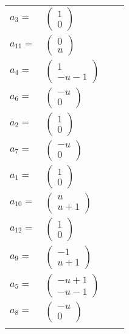 \documentclass[1p]{elsarticle_modified}
\theoremstyle{definition}
\begin{document}
\begin{tabular}{m{7pt} m{180pt} m{7pt} m{180pt} }
\flushright $a_{3}=$&$\begin{pmatrix}1\\0\end{pmatrix}$ \\
\flushright $a_{11}=$&$\begin{pmatrix}0\\u\end{pmatrix}$ \\
\flushright $a_{4}=$&$\begin{pmatrix}1\\- u-1\end{pmatrix}$ \\
\flushright $a_{6}=$&$\begin{pmatrix}- u\\0\end{pmatrix}$ \\
\flushright $a_{2}=$&$\begin{pmatrix}1\\0\end{pmatrix}$ \\
\flushright $a_{7}=$&$\begin{pmatrix}- u\\0\end{pmatrix}$ \\
\flushright $a_{1}=$&$\begin{pmatrix}1\\0\end{pmatrix}$ \\
\flushright $a_{10}=$&$\begin{pmatrix}u\\u+1\end{pmatrix}$ \\
\flushright $a_{12}=$&$\begin{pmatrix}1\\0\end{pmatrix}$ \\
\flushright $a_{9}=$&$\begin{pmatrix}-1\\u+1\end{pmatrix}$ \\
\flushright $a_{5}=$&$\begin{pmatrix}- u+1\\- u-1\end{pmatrix}$ \\
\flushright $a_{8}=$&$\begin{pmatrix}- u\\0\end{pmatrix}$\\&\end{tabular}
\end{document}
